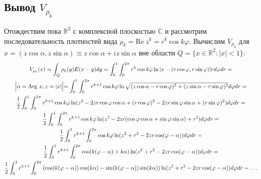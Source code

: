 \documentclass[a4paper, 12pt]{article}
\newcommand{\R}[1]{\mathbb{R}^#1}
\begin{document}
\subsection{Вывод $V_{\rho_k}$}
Отождествим пока $\R{2}$ с комплексной плоскостью $\mathbb{C}$ и рассмотрим последовательность плотностей вида $\rho_k=\text{Re}\ z^k=r^k \cos k\varphi$.
Вычислим $V_{\rho_k}$ для $x=(z \cos\alpha,z \sin \alpha) \equiv z \cos\alpha + i z \sin \alpha$ вне области $Q= \{x \in \R{2}: |x|<1 \}$:
\begin{multline}
    V_{\rho_k}(x)= \int_Q \rho_k(y) E(x-y) dy= \int_0^1 \int_0^{2 \pi} r^k \cos k\varphi \ln |x-(r \cos \varphi, r \sin\varphi)| r d\varphi dr =\\
\Bigl|\alpha = \text{Arg}\ x, z=|x| \Bigl|=
\int_0^1 \int_0^{2 \pi} r^{k+1} \cos k\varphi \ln \sqrt{(z\cos \alpha-r \cos \varphi)^2+(z\sin \alpha-r \sin\varphi)^2} d\varphi dr=\\
\frac{1}{2} \int_0^1 \int_0^{2 \pi} r^{k+1} \cos k\varphi \ln(z^2 - 2z r \cos\varphi \cos \alpha +(r \cos \varphi)^2 - 2z r \sin \varphi \sin \alpha +(r \sin \varphi)^2) d\varphi dr =\\
\frac{1}{2} \int_0^1 \int_0^{2 \pi} r^{k+1} \cos k\varphi \ln(z^2-2zr(\cos \varphi \cos \alpha + \sin \varphi \sin \alpha)+r^{2})d\varphi dr=\\
\frac{1}{2} \int_0^1 r^{k+1}\int_0^{2 \pi}  \cos k\varphi \ln(z^2 + r^{2} - 2zr \cos (\varphi -\alpha)) d\varphi dr=\\
\frac{1}{2} \int_0^1 r^{k+1}\int_0^{2 \pi}\cos (k(\varphi -\alpha)+k\alpha)\ln(z^2 + r^{2} - 2zr \cos (\varphi -\alpha)) d\varphi dr= \\
\frac{1}{2} \int_0^1 r^{k+1}\int_0^{2 \pi}\left(\cos (k(\varphi -\alpha)) \cos(k\alpha) - \sin (k(\varphi -\alpha)) \sin(k\alpha)\right) \ln(z^2 + r^{2} - 2zr \cos (\varphi -\alpha)) d\varphi dr=\dots
\end{multline}
\end{document}
